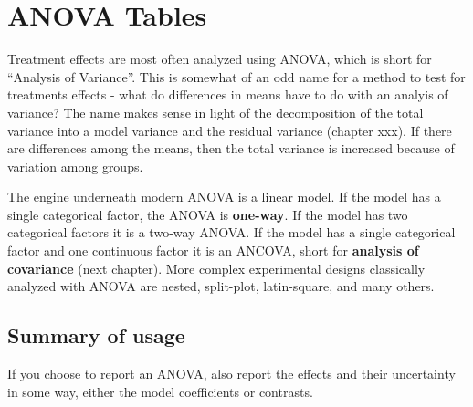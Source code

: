 \documentclass[]{book}
\begin{document}
\chapter{ANOVA Tables}\label{anova-tables}

Treatment effects are most often analyzed using ANOVA, which is short
for ``Analysis of Variance''. This is somewhat of an odd name for a
method to test for treatments effects - what do differences in means
have to do with an analyis of variance? The name makes sense in light of
the decomposition of the total variance into a model variance and the
residual variance (chapter xxx). If there are differences among the
means, then the total variance is increased because of variation among
groups.

The engine underneath modern ANOVA is a linear model. If the model has a
single categorical factor, the ANOVA is \textbf{one-way}. If the model
has two categorical factors it is a two-way ANOVA. If the model has a
single categorical factor and one continuous factor it is an ANCOVA,
short for \textbf{analysis of covariance} (next chapter). More complex
experimental designs classically analyzed with ANOVA are nested,
split-plot, latin-square, and many others.

\section{Summary of usage}\label{summary-of-usage}

If you choose to report an ANOVA, also report the effects and their
uncertainty in some way, either the model coefficients or contrasts.
\end{document}
